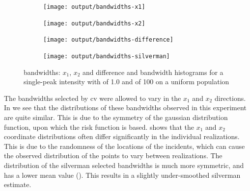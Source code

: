 \begin{figure}[htbp]
    \centering
    \begin{subfigure}[t]{0.45\textwidth}
        \texttt{[image: output/bandwidths-x1]}
        \label{fig:bandwidths:unif_100_1.0_1h:x1}
    \end{subfigure}
    \begin{subfigure}[t]{0.45\textwidth}
        \texttt{[image: output/bandwidths-x2]}
        \label{fig:bandwidths:unif_100_1.0_1h:x2}
    \end{subfigure}

    \begin{subfigure}[t]{0.45\textwidth}
        \texttt{[image: output/bandwidths-difference]}
        \label{fig:bandwidths:unif_100_1.0_1h:diff}
    \end{subfigure}
    \begin{subfigure}[t]{0.45\textwidth}
        \texttt{[image: output/bandwidths-silverman]}
        \label{fig:bandwidths:unif_100_1.0_1h:silverman}
    \end{subfigure}
    \caption[Bandwidths: Single-peak of 100 on uniform population]{ bandwidths: $x_1$, $x_2$ and difference and  bandwidth histograms for a single-peak intensity with  of 1.0 and  of 100 on a uniform population}
    \label{fig:bandwidths:unif_100_1.0_1h}
\end{figure}

The bandwidths selected by \gls{cv} were allowed to vary in the $x_1$ and $x_2$ directions.
In  we see that the distributions of these bandwidths observed in this experiment are quite similar.
This is due to the symmetry of the gaussian distribution function,
upon which the \gls{risk} function is based.
 shows that the $x_1$ and $x_2$ coordinate distributions often differ significantly in the individual realizations.
This is due to the randomness of the locations of the \glspl{incident},
which can cause the observed distribution of the points to vary between realizations.
The distribution of the \gls{silverman} selected bandwidths is much more symmetric, and has a lower mean value ().
This results in a slightly under-smoothed \gls{silverman} estimate.

